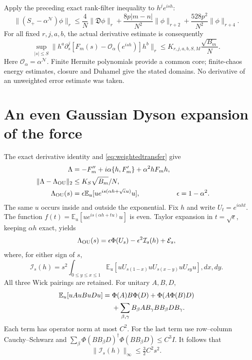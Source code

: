 \documentclass[11pt,a4paper]{article}
\newcommand{\EE}{\mathbb E}
\newcommand{\NN}{\mathcal N}
\newcommand{\DD}{\mathfrak D}
\begin{document}
Apply the preceding exact rank-filter inequality to $h^je^{ish}$:
\begin{equation}
 \|(S_+-\alpha^{\NN})\phi\|_r\le
 \frac4N\|\DD\phi\|_r+
 \frac{8p|m-n|}{N^2}\|\phi\|_{r+2}+
 \frac{528p^2}{N^2}\|\phi\|_{r+4}.
\end{equation}
For all fixed $r,j,a,b$, the actual derivative estimate is consequently
\begin{equation}
 \boxed{\quad
 \sup_{|s|\le S}\|h^a\partial_s^j[F_m(s)-\mathcal O_\alpha(e^{ish})]h^b\|_r
 \le K_{r,j,a,b,S,M}\frac{\sqrt{B_m}}N.\quad}
 \label{eq:weightedtransfer}
\end{equation}
Here $\mathcal O_\alpha=\alpha^{\NN}$. Finite Hermite polynomials
provide a common core; finite-chaos energy estimates, closure and
Duhamel give the stated domains. No derivative of an unweighted
error estimate was taken.

\newpage
\section{An even Gaussian Dyson expansion of the force}
The exact derivative identity and \eqref{eq:weightedtransfer} give
\begin{align}
 \Lambda&=-F_m''+i\alpha\{h,F_m'\}+\alpha^2hF_mh,\\
 \|\Lambda-\Lambda_{\rm OU}\|_2&\le K_S\sqrt{B_m}/N,\label{eq:forceerror}\\
 \Lambda_{\rm OU}(s)&=\epsilon\EE_u[u e^{is(\alpha h+\sqrt\epsilon u)}u],
 &\epsilon&=1-\alpha^2.
\end{align}
The same $u$ occurs inside and outside the exponential. Fix $h$ and
write $U_t=e^{i\alpha ht}$. The function
$f(t)=\EE_u[u e^{is(\alpha h+tu)}u]$ is even. Taylor expansion in
$t=\sqrt\epsilon$, keeping $\alpha h$ exact, yields
\begin{equation}
 \Lambda_{\rm OU}(s)=\epsilon\Phi(U_s)-\epsilon^2\mathcal I_s(h)
                       +\mathcal E_s,
 \label{eq:dyson}
\end{equation}
where, for either sign of $s$,
\begin{equation}
 \mathcal I_s(h)=s^2\int_{0\le y\le x\le1}
 \EE_u[uU_{s(1-x)}uU_{s(x-y)}uU_{sy}u],dx,dy.
\end{equation}
All three Wick pairings are retained. For unitary $A,B,D$,
\begin{align}
 \EE_u[uAuBuDu]
 ={}&\Phi(A)B\Phi(D)+\Phi(A\Phi(B)D)\notag\\
 &+\sum_{\beta,\gamma}B_\beta A B_\gamma B B_\beta D B_\gamma.
\end{align}
Each term has operator norm at most $C^2$. For the last term use
row--column Cauchy--Schwarz and
$\sum_\beta\Phi(BB_\beta D)^\dagger\Phi(BB_\beta D)\le C^3I$.
It follows that
\begin{equation}
 \|\mathcal I_s(h)\|_\infty\le\tfrac32 C^2s^2.
\end{equation}
\end{document}
